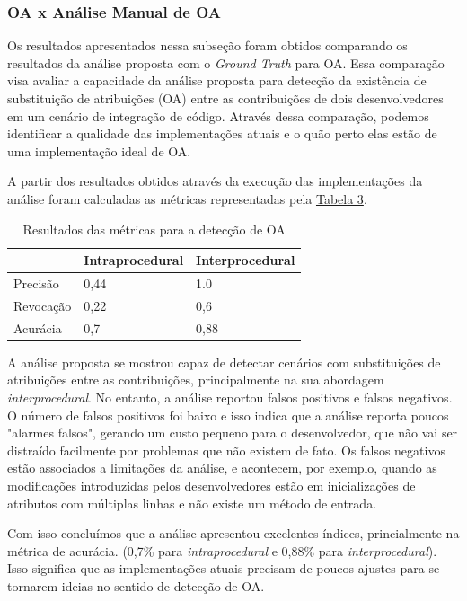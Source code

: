 \subsubsection{OA x Análise Manual de OA}

Os resultados apresentados nessa subseção foram obtidos comparando os resultados da análise proposta com o \emph{Ground Truth} para OA. Essa comparação visa avaliar a capacidade da análise proposta para detecção da existência de substituição de atribuições (OA) entre as contribuições de dois desenvolvedores em um cenário de integração de código. Através dessa comparação, podemos identificar a qualidade das implementações atuais e o quão perto elas estão de uma implementação ideal de OA.

A partir dos resultados obtidos através da execução das implementações da análise foram calculadas as métricas representadas pela \hyperref[tab:metrics-oa]{Tabela 3}.

\begin{table}[!h]
    \centering
    \begin{tabular}{ l  l  l }
        \hline
        & Intraprocedural & Interprocedural  \\
        \hline
        Precisão & 0,44 & 1.0 \\
        \hline
        Revocação & 0,22 & 0,6 \\
        \hline
        Acurácia  & 0,7 & 0,88 \\
        \hline
        
    \end{tabular}
    \caption{Resultados das métricas para a detecção de OA}
    \label{tab:metrics-oa}
\end{table}

A análise proposta se mostrou capaz de detectar cenários com substituições de atribuições entre as contribuições, principalmente na sua abordagem \emph{interprocedural}. No entanto, a análise reportou falsos positivos e falsos negativos. O número de falsos positivos foi baixo e isso indica que a análise reporta poucos "alarmes falsos", gerando um custo pequeno para o desenvolvedor, que não vai ser distraído facilmente por problemas que não existem de fato. Os falsos negativos estão associados a limitações da análise, e acontecem, por exemplo, quando as modificações introduzidas pelos desenvolvedores estão em inicializações de atributos com múltiplas linhas e não existe um método de entrada. 

Com isso concluímos que a análise apresentou excelentes índices, princialmente na métrica de  acurácia. (0,7\% para \emph{intraprocedural} e 0,88\% para \emph{interprocedural}). Isso significa que as implementações atuais precisam de poucos ajustes para se tornarem ideias no sentido de detecção de OA.


